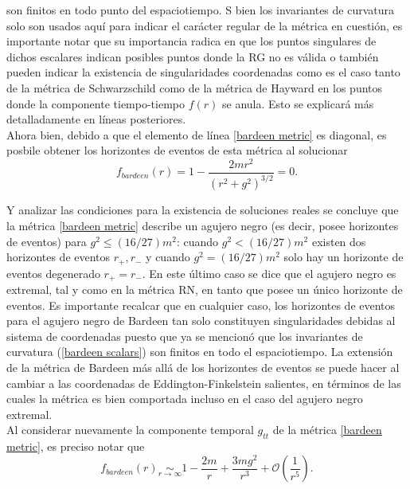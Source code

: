 \documentclass[16pt,a4paper]{article}
\numberwithin{equation}{section}
\theoremstyle{definition}
\begin{document}
son finitos en todo punto  del espaciotiempo. S bien los invariantes de curvatura solo son usados aquí para indicar el carácter regular de la métrica en cuestión, es importante notar que su importancia radica en que los puntos singulares de dichos escalares indican posibles puntos donde la RG no es válida o también pueden indicar la existencia de singularidades coordenadas como es el caso tanto de la métrica de Schwarzschild como de la métrica de Hayward en los puntos donde la componente tiempo-tiempo $f(r)$ se anula. Esto se explicará más detalladamente en líneas posteriores.\\

Ahora bien, debido a que el elemento de línea \eqref{bardeen metric} es diagonal, es posbile obtener los horizontes de eventos de esta métrica al solucionar
\begin{equation}
f_{bardeen}(r) = 1 - \frac{2mr^2}{(r^2 + g^2)^{3/2}} = 0.
\end{equation}

Y analizar las condiciones para la existencia de soluciones reales se concluye que la métrica \eqref{bardeen metric} describe un agujero negro (es decir, posee horizontes de eventos) para $g^2 \leq (16/27)m^2$: cuando $g^2 < (16/27)m^2$ existen dos horizontes de eventos $r_{+},r_{-}$ y cuando $g^2 = (16/27)m^2$ solo hay un horizonte de eventos degenerado $r_{+} = r_{-}$. En este último caso se dice que el agujero negro es extremal, tal y como en la métrica RN, en tanto que posee un único horizonte de eventos. Es importante recalcar que en cualquier caso, los horizontes de eventos para el agujero negro de Bardeen tan solo constituyen singularidades debidas al sistema de coordenadas puesto que ya se mencionó que los invariantes de curvatura (\ref{bardeen scalars}) son finitos en todo el espaciotiempo. La extensión de la métrica de Bardeen más allá de los horizontes de eventos se puede hacer al cambiar a las coordenadas de Eddington-Finkelstein salientes, en términos de las cuales la métrica es bien comportada incluso en el caso del agujero negro extremal. \\

Al considerar nuevamente la componente temporal $g_{tt}$ de la métrica \eqref{bardeen metric}, es preciso notar que
\begin{equation}
f_{bardeen}(r) \underset{r \to \infty}{\sim} 1 - \frac{2m}{r} + \frac{3mg^2}{r^3} + \mathcal{O}\left( \frac{1}{r^5} \right).
\end{equation}
\end{document}
